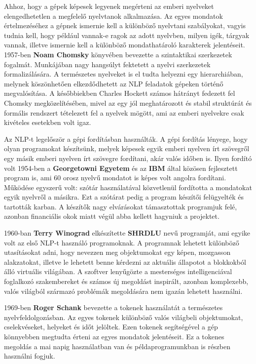 Ahhoz, hogy a gépek képesek legyenek megérteni az emberi nyelveket elengedhetetlen a megfelelő nyelvtanok alkalmazása. Az egyes mondatok értelmezéséhez a gépnek ismernie kell a különböző nyelvtani szabályokat, vagyis tudnia kell, hogy például vannak-e ragok az adott nyelvben, milyen igék, tárgyak vannak, illetve ismernie kell a különböző mondathatároló karakterek jelentéseit. 1957-ben \textbf{Noam Chomsky} könyvében bevezette a szintaktikai szerkezetek fogalmát. Munkájában nagy hangsúlyt fektetett a nyelvi szerkezetek formalizálására. A természetes nyelveket is el tudta helyezni egy hierarchiában, melynek köszönhetően elkezdődhetett az NLP feladatok gépeken történő megvalósítása. A későbbiekben Charles Hockett számos hátrányt fedezett fel Chomsky megközelítésében, mivel az egy jól meghatározott és stabil struktúrát és formális rendszert tételezett fel a nyelvek mögött, ami az emberi nyelvekre csak kivételes esetekben volt igaz.

Az NLP-t legelőször a gépi fordításban használták. A gépi fordítás lényege, hogy olyan programokat készítsünk, melyek képesek egyik emberi nyelven írt szövegről egy másik emberi nyelven írt szövegre fordítani, akár valós időben is. Ilyen fordító volt 1954-ben a \textbf{Georgetowni Egyetem} és az \textbf{IBM} által közösen fejlesztett program is, ami 60 orosz nyelvű mondatot is képes volt angolra fordítani. Működése egyszerű volt: szótár használatával közvetlenül fordította a mondatokat egyik nyelvről a másikra. Ezt a szótárat pedig a program készítői felügyelték és tartották karban. A készítők nagy elvárásokat támasztottak programjuk felé, azonban financiális okok miatt végül abba kellett hagyniuk a projektet.

1960-ban \textbf{Terry Winograd} elkészítette \textbf{SHRDLU} nevű programját, ami egyike volt az első NLP-t használó programoknak. A programnak lehetett különböző utasításokat adni, hogy nevezzen meg objektumokat egy képen, mozgasson alakzatokat, illetve le lehetett benne kérdezni az aktuális állapotot a blokkokból álló virtuális világában. A szoftver lenyűgözte a mesterséges intelligenciával foglalkozó szakembereket és számos új megoldást inspirált, azonban komplexebb, valós világból származó problémák megoldására nem igazán lehetett használni.

1969-ben \textbf{Roger Schank} bevezette a tokenek használatát a természetes nyelvfeldolgozásban. Az egyes tokenek különböző valós világbeli objektumokat, cselekvéseket, helyeket és időt jelöltek. Ezen tokenek segítségével a gép könnyebben megtudta érteni az egyes mondatok jelentéseit. Ez a tokenes megoldás a mai napig használatban van és példaprogramunkban is részben használni fogjuk.

